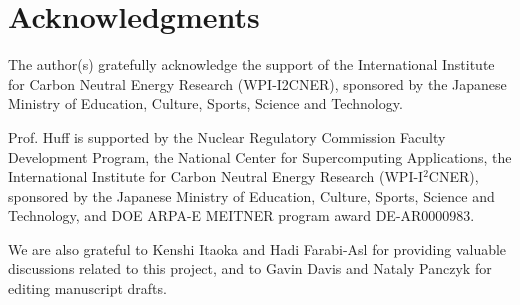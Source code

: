 %
%
%
%
%
%

\section{Acknowledgments}

The author(s) gratefully acknowledge the support of the International Institute for Carbon Neutral Energy Research (WPI-I2CNER), sponsored by the Japanese Ministry of Education, Culture, Sports, Science and Technology. 

Prof. Huff is supported by the Nuclear Regulatory Commission Faculty Development Program, the National Center for Supercomputing Applications, the International Institute for Carbon Neutral Energy Research (WPI-I$^2$CNER), sponsored by the Japanese Ministry of Education, Culture, Sports, Science and Technology, and  DOE ARPA-E MEITNER program award DE-AR0000983.

We are also grateful to Kenshi Itaoka and Hadi Farabi-Asl for providing valuable discussions related to this project, and to Gavin Davis and Nataly Panczyk for editing manuscript drafts.
